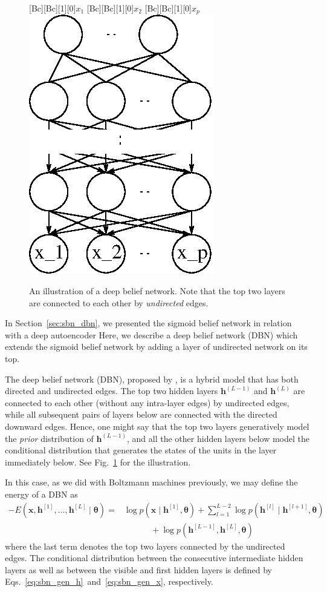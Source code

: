 \documentclass{now}
\newcommand{\qlay}[1]{\left[#1\right]}
\newcommand{\vect}[1]{\mathbf{#1}}
\newcommand{\vects}[1]{\boldsymbol{#1}}
\newcommand{\vh}[0]{\vect{h}}
\newcommand{\vx}[0]{\vect{x}}
\newcommand{\TT}[0]{{\vects{\theta}}}
\begin{document}
\begin{figure}
    \centering
    [Bc][Bc][1][0]{$x_1$}
    [Bc][Bc][1][0]{$x_2$}
    [Bc][Bc][1][0]{$x_p$}
    \includegraphics[width=0.27\columnwidth]{../figures/dbn.eps}
    \caption{An illustration of a deep belief network. Note
    that the top two layers are connected to each other by
    \textit{undirected} edges.}
    \label{fig:dbn}
    \vspace{-2mm}
\end{figure}

In Section~\ref{sec:sbn_dbn}, we presented the sigmoid belief
network in relation with a deep autoencoder
Here, we describe a deep belief network
(DBN) \citep{Hinton2006nc}
which extends the sigmoid belief network by adding a layer of
undirected network on its top. 

The deep belief network (DBN), proposed by
\citet{Hinton2006nc}, is a hybrid model that has both
directed and undirected edges.  The top two hidden layers
$\vh^{(L-1)}$ and $\vh^{(L)}$ are connected to each other 
(without any intra-layer edges) by undirected edges,
while all subsequent pairs of layers below are connected
with the directed downward edges. Hence, one might say that
the top two layers generatively model the \textit{prior}
distribution of $\vh^{(L-1)}$, and all the other hidden layers
below model the conditional distribution that generates the
states of the units in the layer immediately below. See
Fig.~\ref{fig:dbn} for the illustration.

In this case, as we did with Boltzmann machines previously,
we may define the energy of a DBN as
\begin{align}
    \label{eq:dbn_energy}
    -E(\vx, \vh^{\qlay{1}}, \dots, \vh^{\qlay{L}} \mid \TT)
    = 
    &\log p(\vx \mid \vh^{\qlay{1}}, \TT) + \sum_{l=1}^{L-2} \log
    p(\vh^{\qlay{l}} \mid \vh^{\qlay{l+1}}, \TT) 
    \nonumber \\
    &\phantom{= \log}+\log p(\vh^{\qlay{L-1}}, \vh^{\qlay{L}}, \TT) 
\end{align}
where the last term denotes the top two layers connected by
the undirected edges. The conditional distribution between
the consecutive intermediate hidden layers as well as between
the visible and first hidden layers is defined by
Eqs.~\eqref{eq:sbn_gen_h}~and~\eqref{eq:sbn_gen_x},
respectively.
\end{document}
